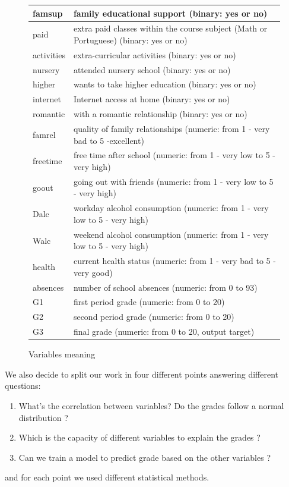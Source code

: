 \documentclass[a4paper, 11pt]{report}
\theoremstyle{definition}
\numberwithin{equation}{section}		%
\numberwithin{figure}{section}			%
\numberwithin{table}{section}				%
\begin{document}
\begin{figure}
{{\begin{tabular}{ |p{2cm}|p{13cm}| }
\hline
famsup & family educational support (binary: yes or no)\\
\hline
paid & extra paid classes within the course subject (Math or Portuguese) (binary: yes or no)\\
\hline
activities & extra-curricular activities (binary: yes or no)\\
\hline
nursery & attended nursery school (binary: yes or no)\\
\hline
higher & wants to take higher education (binary: yes or no)\\
\hline
internet & Internet access at home (binary: yes or no)\\
\hline
romantic & with a romantic relationship (binary: yes or no)\\
\hline
famrel & quality of family relationships (numeric: from 1 - very bad to 5 -excellent)\\
\hline
freetime & free time after school (numeric: from 1 - very low to 5 - very high)\\
\hline
goout & going out with friends (numeric: from 1 - very low to 5 - very high)\\
\hline
Dalc & workday alcohol consumption (numeric: from 1 - very low to 5 - very high)\\
\hline
Walc & weekend alcohol consumption (numeric: from 1 - very low to 5 - very high)\\
\hline
health & current health status (numeric: from 1 - very bad to 5 - very good)\\
\hline
absences & number of school absences (numeric: from 0 to 93)\\
\hline
G1 & first period grade (numeric: from 0 to 20)\\
\hline
G2 & second period grade (numeric: from 0 to 20)\\
\hline
G3 & final grade (numeric: from 0 to 20, output target)\\
\hline
\end{tabular}
}
}
\caption{\label{fig:text3}Variables meaning}
\end{figure}


We also decide to split our work in four different points answering different questions:
\begin{enumerate}
\item What's the correlation between variables? Do the grades follow a normal distribution ?
\item Which is the capacity of different variables to explain the grades ?
\item Can we train a model to predict grade based on the other variables ?
\end{enumerate}
and for each point we used different statistical methods.
\end{document}

